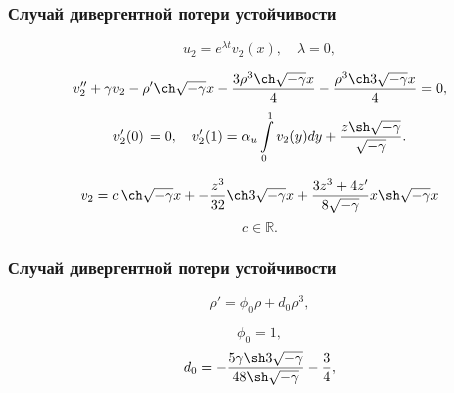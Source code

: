 \documentclass[fullscreen=true, unicode, bookmarks=false]{beamer}
\begin{document}
\begin{frame}
\frametitle{ Случай дивергентной потери устойчивости }

$$ u_2 = e^{\lambda t}v_2(x), \quad \lambda = 0, $$

\medskip

\begin{equation}
	v_2'' + \gamma v_2 - \rho' \ch \sqrt{-\gamma} x - \frac{3\rho^3\ch\sqrt{-\gamma}x}{4} - \frac{\rho^3\ch3\sqrt{-\gamma}x}{4} = 0,
\end{equation}
\begin{equation}
	v_2'(0) \, = 0, \quad v_2'(1) = \alpha_u\int\limits_{0}^{1} v_2(y) dy + \frac{z\sh\sqrt{-\gamma}}{\sqrt{-\gamma}}.
\end{equation}

\medskip

$$ v_2 = c\,\ch \sqrt{-\gamma} x + - \frac{z^3}{32}\ch3\sqrt{-\gamma}x + \frac{3z^3+4z'}{8\sqrt{-\gamma}}x\sh\sqrt{-\gamma}x $$
$$ c \in \mathbb{R}. $$

\end{frame}

\begin{frame}
\frametitle{ Случай дивергентной потери устойчивости }

\begin{equation}
	\rho' = \phi_0 \rho + d_0 \rho^3,
\end{equation}

\bigskip

$$ \phi_0 = 1 , $$
$$ d_0 = -\frac{5\gamma\sh3\sqrt{-\gamma}}{48\sh\sqrt{-\gamma}} - \frac{3}{4}, $$

\end{frame}
\end{document}
